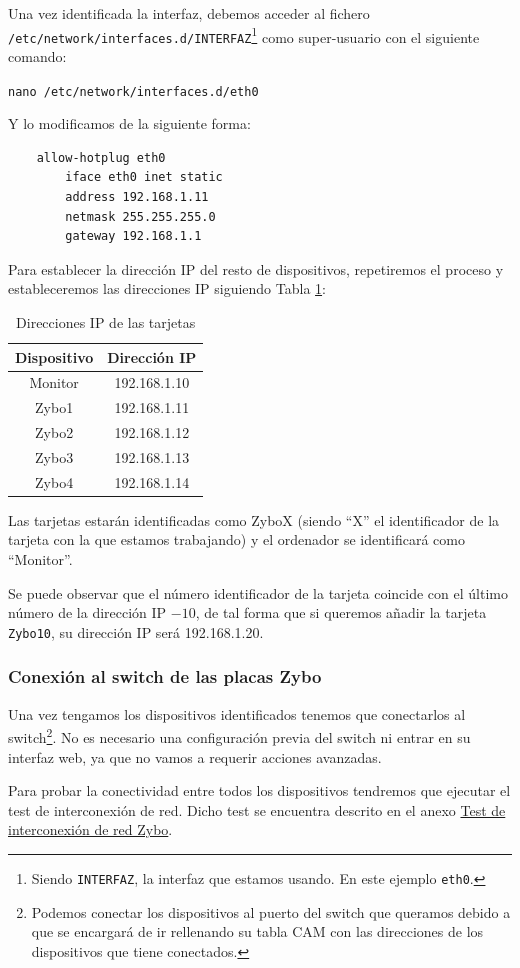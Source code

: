 \begin{itemize}
	Una vez identificada la interfaz, debemos acceder al fichero\\ \texttt{/etc/network/interfaces.d/INTERFAZ}\footnote{Siendo \texttt{INTERFAZ}, la interfaz que estamos usando. En este ejemplo \texttt{eth0}.} como super-usuario con el siguiente comando:
	\begin{center}
		\texttt{nano /etc/network/interfaces.d/eth0}
	\end{center}
	Y lo modificamos de la siguiente forma:
	\begin{lstlisting}
	allow-hotplug eth0
	    iface eth0 inet static
	    address 192.168.1.11
	    netmask 255.255.255.0
	    gateway 192.168.1.1
	\end{lstlisting}
	\newpage
	Para establecer la dirección IP del resto de dispositivos, repetiremos el proceso y estableceremos las direcciones IP siguiendo Tabla \ref{Direcciones IP de las tarjetas}:
	\begin{table}[h]
		\centering
		\begin{tabular}{|c|c|}
			\hline
			\textbf{Dispositivo} & \textbf{Dirección IP} \\ \hline
			Monitor & 192.168.1.10 \\ \hline
			Zybo1 & 192.168.1.11 \\ \hline
			Zybo2 & 192.168.1.12 \\ \hline
			Zybo3 & 192.168.1.13 \\ \hline
			Zybo4 & 192.168.1.14 \\ \hline
		\end{tabular}
		\caption{Direcciones IP de las tarjetas}
		\label{Direcciones IP de las tarjetas}
	\end{table}
	
	Las tarjetas estarán identificadas como ZyboX (siendo ``X'' el identificador de la tarjeta con la que estamos trabajando) y el ordenador se identificará como ``Monitor''.
	
	Se puede observar que el número identificador de la tarjeta coincide con el último número de la dirección IP $- 10$, de tal forma que si queremos añadir la tarjeta \texttt{Zybo10}, su dirección IP será 192.168.1.20.
\end{itemize}


\subsubsection{Conexión al switch de las placas Zybo}
Una vez tengamos los dispositivos identificados tenemos que conectarlos al switch\footnote{Podemos conectar los dispositivos al puerto del switch que queramos debido a que se encargará de ir rellenando su tabla CAM con las direcciones de los dispositivos que tiene conectados.}. No es necesario una configuración previa del switch ni entrar en su interfaz web, ya que no vamos a requerir acciones avanzadas.

Para probar la conectividad entre todos los dispositivos tendremos que ejecutar el test de interconexión de red. Dicho test se encuentra descrito en el anexo \hyperlink{TestConexion}{Test de interconexión de red Zybo}. 